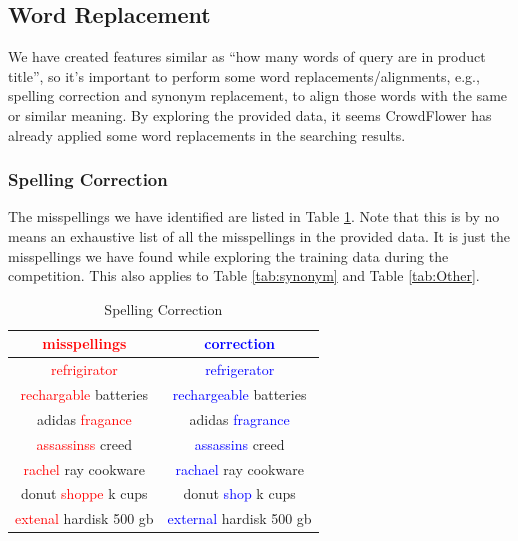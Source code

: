 \documentclass[12pt]{article}
\begin{document}
\subsection{Word Replacement}
We have created features similar as ``how many words of query are in product title'', so it's important to perform some word replacements/alignments, e.g., spelling correction and synonym replacement, to align those words with the same or similar meaning. By exploring the provided data, it seems CrowdFlower has already applied some word replacements in the searching results.

\subsubsection{Spelling Correction}
The misspellings we have identified are listed in Table \ref{tab:spelling_correction}. Note that this is by no means an exhaustive list of all the misspellings in the provided data. It is just the misspellings we have found while exploring the training data during the competition. This also applies to Table \ref{tab:synonym} and Table \ref{tab:Other}.
\begin{table}[!htb]
\centering
\caption{Spelling Correction}
\label{tab:spelling_correction}
\begin{tabular}{|c|c|}
\hline
\textcolor{red}{misspellings} & \textcolor{blue}{correction} \\
\hline\hline
\textcolor{red}{refrigirator} & \textcolor{blue}{refrigerator} \\
\textcolor{red}{rechargable} batteries & \textcolor{blue}{rechargeable} batteries \\
adidas \textcolor{red}{fragance} & adidas \textcolor{blue}{fragrance}\\
\textcolor{red}{assassinss} creed & \textcolor{blue}{assassins} creed\\
\textcolor{red}{rachel} ray cookware & \textcolor{blue}{rachael} ray cookware \\
donut \textcolor{red}{shoppe} k cups & donut \textcolor{blue}{shop} k cups \\
\textcolor{red}{extenal} hardisk 500 gb & \textcolor{blue}{external} hardisk 500 gb \\
\hline
\end{tabular}
\end{table}
\end{document}
